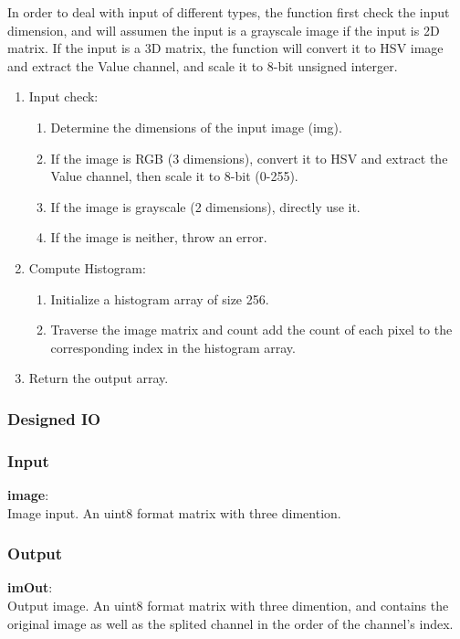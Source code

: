 \documentclass[a4paper,11pt]{article}
\begin{document}
In order to deal with input of different types, the function first check the input dimension, and will assumen the input is a grayscale image if the input is 2D matrix. If the input is a 3D matrix, the function will convert it to HSV image and extract the Value channel, and scale it to 8-bit unsigned interger.\\
\begin{enumerate}
    \item Input check:
        \begin{enumerate}
            \item Determine the dimensions of the input image (img).
            \item If the image is RGB (3 dimensions), convert it to HSV and extract the Value channel, then scale it to 8-bit (0-255).
            \item If the image is grayscale (2 dimensions), directly use it.
            \item If the image is neither, throw an error.
        \end{enumerate}

    \item Compute Histogram:
        \begin{enumerate}
            \item Initialize a histogram array of size 256.
            \item Traverse the image matrix and count add the count of each pixel to the corresponding index in the histogram array.
        \end{enumerate}

    \item Return the output array.
\end{enumerate}
\subsubsection{Designed IO}
\subsubsection*{Input}
\textbf{image}: \\
Image input. An uint8 format matrix with three dimention.
\subsubsection*{Output}
\textbf{imOut}: \\
Output image. An uint8 format matrix with three dimention, and contains the original image as well as the splited channel in the order of the channel's index.
\end{document}
